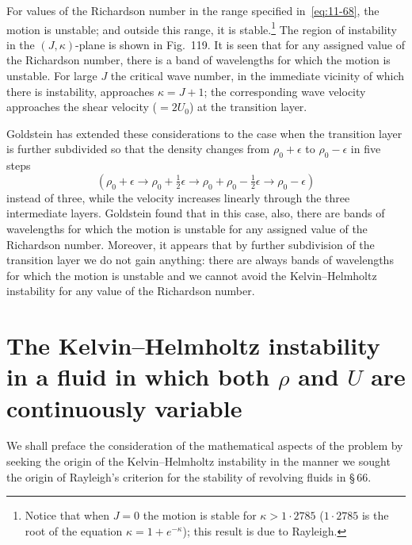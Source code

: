 
For values of the Richardson number in the range specified in~\eqref{eq:11-68}, the motion is unstable; and outside this range, it is stable.\footnote{Notice that when $J = 0$ the motion is stable for $\kappa > 1{\cdot}2785$ ($1{\cdot}2785$ is the root of the equation $\kappa = 1+e^{-\kappa}$); this result is due to Rayleigh.} The region of instability in the $(J,\kappa)$-plane is shown in Fig.\ 119. It is seen that for any assigned value of the Richardson number, there is a band of wavelengths for which the motion is unstable. For large $J$ the critical wave number, in the immediate vicinity of which there is instability, approaches $\kappa = J+1$; the corresponding wave velocity approaches the shear velocity ($= 2U_0$) at the transition layer.

Goldstein has extended these considerations to the case when the transition layer is further subdivided so that the density changes from $\rho_0+\epsilon$ to $\rho_0-\epsilon$ in five steps
\[
(\rho_0+\epsilon \to \rho_0+\tfrac{1}{2}\epsilon \to \rho_0+\rho_0-\tfrac{1}{2}\epsilon \to \rho_0-\epsilon)
\]
instead of three, while the velocity increases linearly through the three intermediate layers. Goldstein found that in this case, also, there are bands of wavelengths for which the motion is unstable for any assigned value of the Richardson number. Moreover, it appears that by further subdivision of the transition layer we do not gain anything: there are always bands of wavelengths for which the motion is unstable and we cannot avoid the Kelvin--Helmholtz instability for any value of the Richardson number.

\section{The Kelvin--Helmholtz instability in a fluid in which both $\rho$ and $U$ are continuously variable}\label{sec:103}

We shall preface the consideration of the mathematical aspects of the problem by seeking the origin of the Kelvin--Helmholtz instability in the manner we sought the origin of Rayleigh's criterion for the stability of revolving fluids in \S\,66.

